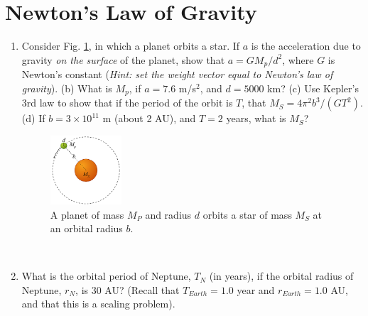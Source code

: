\documentclass[10pt]{article}
\begin{document}
\section{Newton's Law of Gravity}
\begin{enumerate}
\item Consider Fig. \ref{fig:planet}, in which a planet orbits a star.  If $a$ is the acceleration due to gravity \textit{on the surface} of the planet, show that $a = GM_p/d^2$, where $G$ is Newton's constant (\textit{Hint: set the weight vector equal to Newton's law of gravity}).  (b)  What is $M_p$, if $a=7.6$ m/s$^2$, and $d = 5000$ km? (c) Use Kepler's 3rd law to show that if the period of the orbit is $T$, that $M_S = 4\pi^2 b^3/(GT^2)$. (d) If $b = 3 \times 10^{11}$ m (about 2 AU), and $T = 2$ years, what is $M_S$? \\ \vspace{2cm}
\begin{figure}[hb]
\centering
\includegraphics[width=0.25\textwidth]{figures/planet.png}
\caption{\label{fig:planet} A planet of mass $M_P$ and radius $d$ orbits a star of mass $M_S$ at an orbital radius $b$.}
\end{figure} \\ \vspace{0.5cm}
\item What is the orbital period of Neptune, $T_N$ (in years), if the orbital radius of Neptune, $r_N$, is 30 AU? (Recall that $T_{Earth} = 1.0$ year and $r_{Earth} = 1.0$ AU, and that this is a scaling problem). \\ \vspace{1cm}
\end{enumerate}
\end{document}
